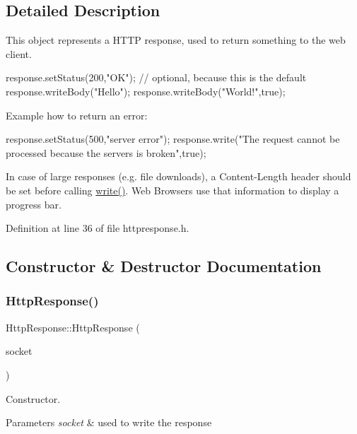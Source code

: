 \subsection{Detailed Description}
This object represents a H\+T\+TP response, used to return something to the web client. 

{\ttfamily 
\begin{DoxyPre}
  response.setStatus(200,"OK"); // optional, because this is the default
  response.writeBody("Hello");
  response.writeBody("World!",true);
\end{DoxyPre}
} 

Example how to return an error\+: {\ttfamily 
\begin{DoxyPre}
  response.setStatus(500,"server error");
  response.write("The request cannot be processed because the servers is broken",true);
\end{DoxyPre}
} 

In case of large responses (e.\+g. file downloads), a Content-\/\+Length header should be set before calling \mbox{\hyperlink{classstefanfrings_1_1_http_response_a6e49919cc568835ca6d81fec02533260}{write()}}. Web Browsers use that information to display a progress bar. 

Definition at line 36 of file httpresponse.\+h.



\subsection{Constructor \& Destructor Documentation}
\mbox{\label{classstefanfrings_1_1_http_response_a97dd17f92a23d9725330978e32cec8d5}} 
\subsubsection{\texorpdfstring{Http\+Response()}{HttpResponse()}}
{\footnotesize\ttfamily Http\+Response\+::\+Http\+Response (\begin{DoxyParamCaption}\item[{Q\+Tcp\+Socket $\ast$}]{socket }\end{DoxyParamCaption})}

Constructor. 
\begin{DoxyParams}{Parameters}
{\em socket} & used to write the response \\
\hline
\end{DoxyParams}


